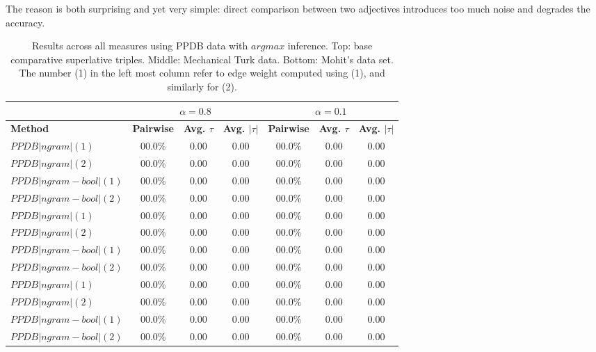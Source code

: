 The reason is both surprising and yet very simple: direct comparison between two adjectives introduces too much noise and degrades the accuracy.

\begin{table}
\small
\centering
\begin{tabular}{|l|ccc|ccc|}
	\hline 
	& \multicolumn{3}{c|}{$\alpha = 0.8$} & \multicolumn{3}{c|}{$\alpha = 0.1$} \\
	\hline 
	\bf Method 
	& \bf Pairwise & \bf Avg. $\tau$ & \bf Avg. $|\tau|$ 
	& \bf Pairwise & \bf Avg. $\tau$ & \bf Avg. $|\tau|$ \\ 
	\hline
	$PPDB|ngram     \lvert (1)$  & 00.0\% & 0.00 & 0.00 & 00.0\% & 0.00 & 0.00 \\
	$PPDB|ngram     \lvert (2)$  & 00.0\% & 0.00 & 0.00 & 00.0\% & 0.00 & 0.00 \\
	$PPDB|ngram-bool\lvert (1)$  & 00.0\% & 0.00 & 0.00 & 00.0\% & 0.00 & 0.00 \\
	$PPDB|ngram-bool\lvert (2)$  & 00.0\% & 0.00 & 0.00 & 00.0\% & 0.00 & 0.00 \\
	\hline
	\hline 
	$PPDB|ngram     \lvert (1)$  & 00.0\% & 0.00 & 0.00 & 00.0\% & 0.00 & 0.00 \\
	$PPDB|ngram     \lvert (2)$  & 00.0\% & 0.00 & 0.00 & 00.0\% & 0.00 & 0.00 \\
	$PPDB|ngram-bool\lvert (1)$  & 00.0\% & 0.00 & 0.00 & 00.0\% & 0.00 & 0.00 \\
	$PPDB|ngram-bool\lvert (2)$  & 00.0\% & 0.00 & 0.00 & 00.0\% & 0.00 & 0.00 \\
	\hline
	\hline
	$PPDB|ngram     \lvert (1)$  & 00.0\% & 0.00 & 0.00 & 00.0\% & 0.00 & 0.00 \\
	$PPDB|ngram     \lvert (2)$  & 00.0\% & 0.00 & 0.00 & 00.0\% & 0.00 & 0.00 \\
	$PPDB|ngram-bool\lvert (1)$  & 00.0\% & 0.00 & 0.00 & 00.0\% & 0.00 & 0.00 \\
	$PPDB|ngram-bool\lvert (2)$  & 00.0\% & 0.00 & 0.00 & 00.0\% & 0.00 & 0.00 \\
	\hline
\end{tabular}
\caption{\label{font-table} Results across all measures using PPDB data with $argmax$ inference. Top: base comparative superlative triples. Middle: Mechanical Turk data. Bottom: Mohit's data set. The number (1) in the left most column refer to edge weight computed using (1), and similarly for (2). }
\end{table}


